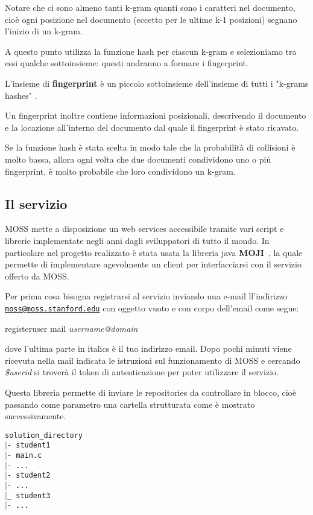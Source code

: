 				Notare che ci sono almeno tanti k-gram quanti sono i caratteri nel documento, cioè ogni posizione nel documento (eccetto per le ultime k-1 posizioni) segnano l'inizio di un k-gram.
				
				A questo punto utilizza la funzione hash per ciascun k-gram e selezioniamo tra essi qualche sottoinsieme: questi andranno a formare i fingerprint. 
				
				L'insieme di \textbf{fingerprint} è un piccolo sottoinsieme dell'insieme di tutti i "k-grams hashes" . 
				
				Un fingerprint inoltre contiene informazioni posizionali, descrivendo il documento e la locazione all'interno del documento dal quale il fingerprint è stato ricavato. 
				
				Se la funzione hash è stata scelta in modo tale che la probabilità di collisioni è molto bassa, allora ogni volta che due documenti condividono uno o più fingerprint, è molto probabile che loro condividono un k-gram. 
			
		\subsection{Il servizio}
			MOSS mette a disposizione un web services accessibile tramite vari script e librerie implementate negli anni dagli sviluppatori di tutto il mondo. In particolare nel progetto realizzato è stata usata la libreria java \textbf{MOJI}~\citep{MOJI}, la quale permette di implementare agevolmente un client per interfacciarsi con il servizio offerto da MOSS.
			
			Per prima cosa bisogna registrarsi al servizio inviando una e-mail ll'indirizzo \href{mailto:moss@moss.stanford.edu}{\nolinkurl{moss@moss.stanford.edu}} con oggetto vuoto e con corpo dell'email come segue:
			\begin{tcolorbox}
				registeruser 
				mail \textit{username@domain}
			\end{tcolorbox}
			dove l'ultima parte in italics è il tuo indirizzo email.
			Dopo pochi minuti viene ricevuta nella mail indicata le istruzioni sul funzionamento di MOSS e cercando \textit{\$userid} si troverà il token di autenticazione per poter utilizzare il servizio.
			
			Questa libreria permette di inviare le repositories da controllare in blocco, cioè passando come parametro una cartella strutturata come è mostrato successivamente.
			
			\begin{tcolorbox}
				\texttt{\tab solution\_directory\\ 
						\tab $\vert$- student1\\
						\tab[1.5cm] $\vert$- main.c\\
						\tab[1.5cm] $\vert$- ...\\
						\tab $\vert$- student2\\
						\tab[1.5cm] $\vert$- ...\\
						\tab $\vert$\_ student3\\
						\tab[1.5cm] $\vert$- ...
					}
			\end{tcolorbox}
			
